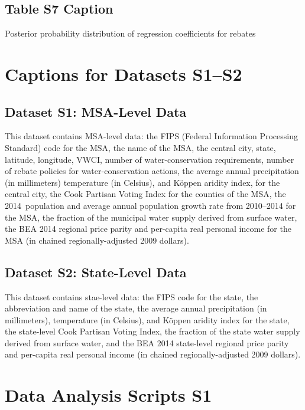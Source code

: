 \documentclass[draft]{agujournal}
\begin{document}
\subsection*{Table S7 Caption}
\begin{table}[H]
\centering
\caption{Posterior probability distribution of regression coefficients for rebates}
\label{tab:reb_posterior}
\end{table}



\section*{Captions for Datasets S1--S2}

\subsection*{Dataset S1: MSA-Level Data}

This dataset contains MSA-level data: the FIPS (Federal Information Processing Standard) code for the MSA,
the name of the MSA, the central city, state, latitude, longitude,
VWCI, number of water-conservation requirements, number of rebate policies for water-conservation actions,
the average annual precipitation (in millimeters) temperature (in Celsius), and K\"oppen aridity index, for the central city,
the Cook Partisan Voting Index for the counties of the MSA,
the 2014~population and average annual population growth rate from 2010--2014 for the MSA,
the fraction of the municipal water supply derived from surface water,
the BEA 2014 regional price parity and per-capita real personal income for the MSA (in chained regionally-adjusted 2009 dollars).

\subsection*{Dataset S2: State-Level Data}

This dataset contains stae-level data: the FIPS code for the state, the abbreviation and name of the state,
the average annual precipitation (in millimeters), temperature (in Celsius), and K\"oppen aridity index for the state,
the state-level Cook Partisan Voting Index,
the fraction of the state water supply derived from surface water,
and the BEA 2014 state-level regional price parity and per-capita real personal income (in chained regionally-adjusted 2009 dollars).

\section*{Data Analysis Scripts S1}
\end{document}
